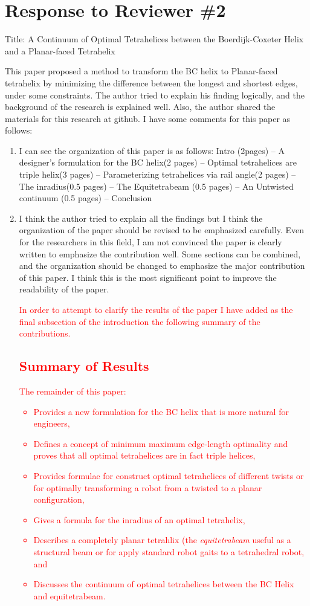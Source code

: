 \documentclass{article}
\newcommand{\highlighttext}[1] {\textcolor{red}{#1}}
\begin{document}
\section{Response to Reviewer \#2}

Title: A Continuum of Optimal Tetrahelices between the Boerdijk-Coxeter Helix and a Planar-faced Tetrahelix 

This paper proposed a method to transform the BC helix to Planar-faced tetrahelix by minimizing the difference between the longest and shortest edges, under some constraints. The author tried to explain his finding logically, and the background of the research is explained well. Also, the author shared the materials for this research at github. I have some comments for this paper as follows:

\begin{enumerate}

  \item
 I can see the organization of this paper is as follows: 
 Intro (2pages) – A designer’s formulation for the BC helix(2 pages) – Optimal tetrahelices are triple helix(3 pages) – Parameterizing tetrahelices via rail angle(2 pages) – The inradius(0.5 pages) – The Equitetrabeam (0.5 pages) – An Untwisted continuum (0.5 pages) – Conclusion
 \item 
   I think the author tried to explain all the findings but I think the organization of the paper should be revised to be emphasized carefully. Even for the researchers in this field, I am not convinced the paper is clearly written to emphasize the contribution well. Some sections can be combined, and the organization should be changed to emphasize the major contribution of this paper. I think this is the most significant point to improve the readability of the paper.

   \highlighttext {
     In order to attempt to clarify the results of the paper I have added as the final subsection of the introduction the following summary of the contributions.
\subsection{Summary of Results}
The remainder of this  paper:
\begin{itemize}
\item Provides a new formulation for the BC helix that is more natural for engineers,
\item Defines a concept of minimum maximum edge-length optimality and proves that all
    optimal tetrahelices are in fact triple helices,
\item Provides formulae for construct optimal tetrahelices of different twists or for optimally
    transforming a
    robot from a twisted to a planar configuration,
\item Gives a formula for the inradius of an optimal tetrahelix,
\item Describes a completely planar tetrahlix (the \emph{equitetrabeam} useful as a structural beam or for apply standard robot gaits to a tetrahedral robot, and
\item Discusses the continuum of optimal tetrahelices between the BC Helix and equitetrabeam.
\end{itemize}
}


\end{enumerate}
\end{document}

